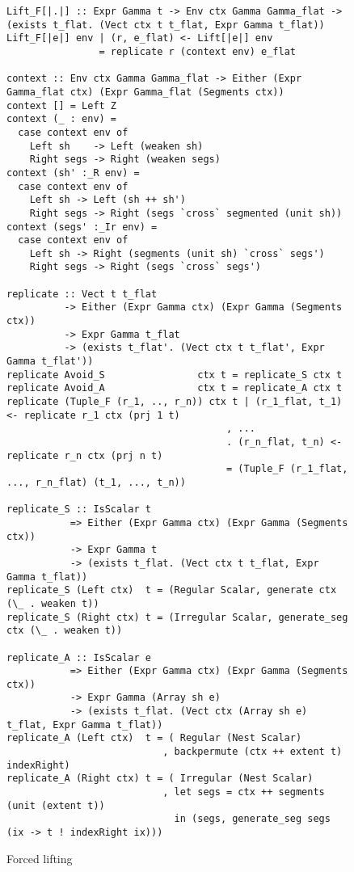 \begin{figure}
\begin{lstlisting}[style=ndp]
Lift_F[|.|] :: Expr Gamma t -> Env ctx Gamma Gamma_flat -> (exists t_flat. (Vect ctx t t_flat, Expr Gamma t_flat))
Lift_F[|e|] env | (r, e_flat) <- Lift[|e|] env
                = replicate r (context env) e_flat

context :: Env ctx Gamma Gamma_flat -> Either (Expr Gamma_flat ctx) (Expr Gamma_flat (Segments ctx))
context [] = Left Z
context (_ : env) =
  case context env of
    Left sh    -> Left (weaken sh)
    Right segs -> Right (weaken segs)
context (sh' :_R env) =
  case context env of
    Left sh -> Left (sh ++ sh')
    Right segs -> Right (segs `cross` segmented (unit sh))
context (segs' :_Ir env) =
  case context env of
    Left sh -> Right (segments (unit sh) `cross` segs')
    Right segs -> Right (segs `cross` segs')

replicate :: Vect t t_flat
          -> Either (Expr Gamma ctx) (Expr Gamma (Segments ctx))
          -> Expr Gamma t_flat
          -> (exists t_flat'. (Vect ctx t t_flat', Expr Gamma t_flat'))
replicate Avoid_S                ctx t = replicate_S ctx t
replicate Avoid_A                ctx t = replicate_A ctx t
replicate (Tuple_F (r_1, .., r_n)) ctx t | (r_1_flat, t_1) <- replicate r_1 ctx (prj 1 t)
                                      , ...
                                      . (r_n_flat, t_n) <- replicate r_n ctx (prj n t)
                                      = (Tuple_F (r_1_flat, ..., r_n_flat) (t_1, ..., t_n))

replicate_S :: IsScalar t
           => Either (Expr Gamma ctx) (Expr Gamma (Segments ctx))
           -> Expr Gamma t
           -> (exists t_flat. (Vect ctx t t_flat, Expr Gamma t_flat))
replicate_S (Left ctx)  t = (Regular Scalar, generate ctx (\_ . weaken t))
replicate_S (Right ctx) t = (Irregular Scalar, generate_seg ctx (\_ . weaken t))

replicate_A :: IsScalar e
           => Either (Expr Gamma ctx) (Expr Gamma (Segments ctx))
           -> Expr Gamma (Array sh e)
           -> (exists t_flat. (Vect ctx (Array sh e) t_flat, Expr Gamma t_flat))
replicate_A (Left ctx)  t = ( Regular (Nest Scalar)
                           , backpermute (ctx ++ extent t) indexRight)
replicate_A (Right ctx) t = ( Irregular (Nest Scalar)
                           , let segs = ctx ++ segments (unit (extent t))
                             in (segs, generate_seg segs (ix -> t ! indexRight ix)))
\end{lstlisting}
\caption{Forced lifting}
\label{fig:forced-lifting}
\end{figure}

